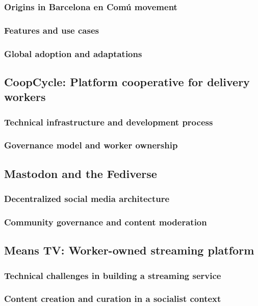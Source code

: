 \subsubsection{Origins in Barcelona en Comú movement}
\subsubsection{Features and use cases}
\subsubsection{Global adoption and adaptations}
\subsection{CoopCycle: Platform cooperative for delivery workers}
\subsubsection{Technical infrastructure and development process}
\subsubsection{Governance model and worker ownership}
\subsection{Mastodon and the Fediverse}
\subsubsection{Decentralized social media architecture}
\subsubsection{Community governance and content moderation}
\subsection{Means TV: Worker-owned streaming platform}
\subsubsection{Technical challenges in building a streaming service}
\subsubsection{Content creation and curation in a socialist context}

